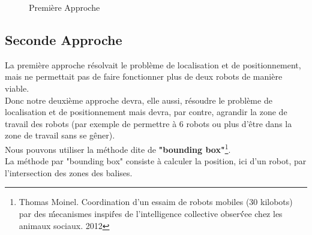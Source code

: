 \documentclass[a4paper,8pt]{report}
\begin{document}
\begin{figure}
  \caption{Premi\`ere Approche}
  \label{figureI}
\end{figure}

\newpage
\subsection*{Seconde Approche}\label{sec:name}

La premi\`ere approche r\'esolvait le probl\`eme de localisation et de positionnement, mais ne permettait pas de faire fonctionner plus de deux robots de mani\`ere viable.\\
Donc notre deuxi\`eme approche devra, elle aussi, r\'esoudre le probl\`eme de localisation et de positionnement mais devra, par contre, agrandir la zone de travail des robots (par exemple de permettre \`a 6 robots ou plus d'\^etre dans la zone de travail sans se g\^ener).\\

\medskip
Nous pouvons utiliser la m\'ethode dite de \textbf{"bounding box"}\footnote{Thomas Moinel. Coordination d’un essaim de robots mobiles (30 kilobots) par des m\'́ecanismes inspir\'́es de l’intelligence collective observ\'́ee chez les animaux sociaux. 2012}.\\
La m\'ethode par "bounding box" consiste \`a calculer la position, ici d'un robot, par l'intersection des zones des balises.
\end{document}
